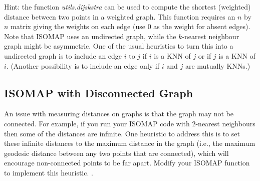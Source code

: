 \documentclass{article}
\begin{document}
Hint: the function \emph{utils.dijskstra} can be used to compute the shortest (weighted) distance between two points in a weighted graph. This function requires an $n$ by $n$ matrix giving the weights on each edge (use $0$ as the weight for absent edges). Note that ISOMAP uses an undirected graph, while the $k$-nearest neighbour graph might be asymmetric. One of the usual heuristics to turn this into a undirected graph is to include an edge $i$ to $j$ if $i$ is a KNN of $j$ or if $j$ is a KNN of $i$. (Another possibility is to include an edge only if $i$ and $j$ are mutually KNNs.)



\subsection{ISOMAP with Disconnected Graph}

An issue with measuring distances on graphs is that the graph may not be connected. For example, if you run your ISOMAP code with $2$-nearest neighbours then some of the distances are infinite. One heuristic to address this is to set these infinite distances to the maximum distance in the graph (i.e., the maximum geodesic distance between any two points that are connected), which will encourage non-connected points to be far apart. Modify your ISOMAP function to implement this heuristic. .

\end{document}
